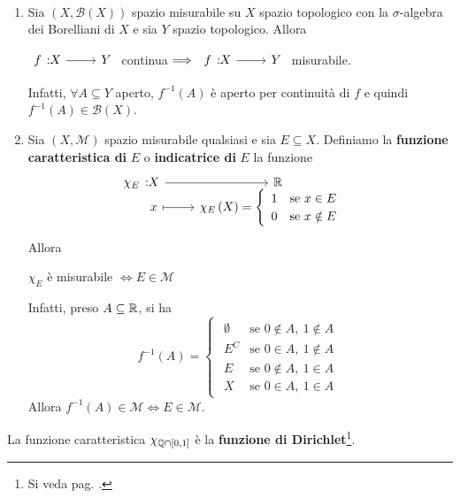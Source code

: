 \begin{examples}~{}
	\begin{enumerate}
		\item Sia $\left(X,\mathcal{B}\left(X\right)\right)$ spazio misurabile su $X$ spazio topologico con la $\sigma$-algebra dei Borelliani di $X$ e sia $Y$ spazio topologico. Allora
		\begin{center}
			$\funz{f}{X}{Y}$ continua$\implies \funz{f}{X}{Y}$ misurabile.
		\end{center}
	Infatti, $\forall A\subseteq Y$ aperto, $f^{-1}\left(A\right)$ è aperto per continuità di $f$ e quindi $f^{-1}\left(A\right)\in\mathcal{B}\left(X\right)$.
	\item Sia $\left(X,\mathcal{M}\right)$ spazio misurabile qualsiasi e sia $E\subseteq X$. Definiamo la \textbf{funzione caratteristica di} $E$ o \textbf{indicatrice di} $E$ la funzione
	\begin{equation}
		\funztot{\chi_E}{X}{\realset}{x}{\chi_E\left(X\right)=\begin{cases}
				\begin{array}{ll}
					1&\text{se }x\in E\\
					0&\text{se }x\notin E\\
				\end{array}
		\end{cases}}
	\end{equation}
Allora
\begin{center}
$\chi_E$ è misurabile $\iff E\in\mathcal{M}$
\end{center}
Infatti, preso $A\subseteq \mathbb{R}$, si ha
\begin{equation*}
f^{-1}\left(A\right)=\begin{cases}
	\begin{array}{ll}
		\emptyset&\text{se }0\notin A,\ 1\notin A\\
		E^C&\text{se }0\in A,\ 1\notin A\\
		E&\text{se }0\notin A,\ 1\in A\\
		X&\text{se }0\in A,\ 1\in A
	\end{array}
\end{cases}
\end{equation*}
Allora $f^{-1}\left(A\right)\in\mathcal{M}\iff E\in\mathcal{M}$.
\end{enumerate}
\end{examples}
\begin{observe}
	La funzione caratteristica $\chi_{\mathbb{Q}\cap\left[0,1\right]}$ è la \textbf{funzione di Dirichlet}\footnote{Si veda pag. \pageref{funzionedirichlet}.}.
\end{observe}
